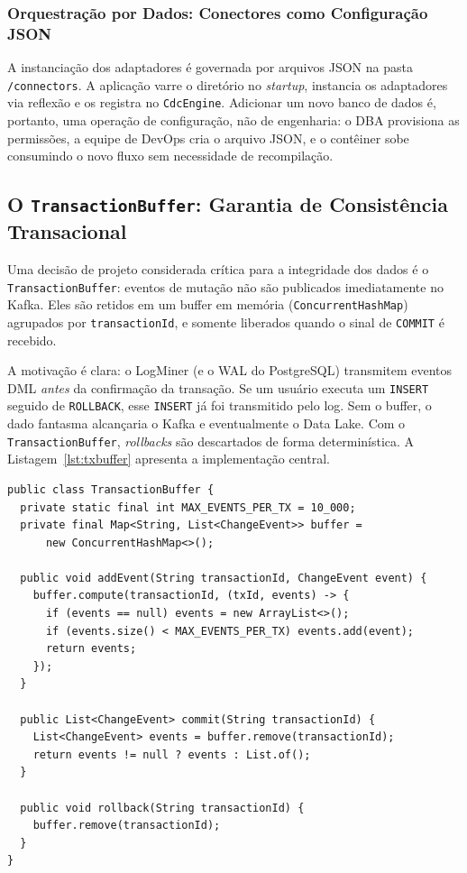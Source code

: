 \documentclass[12pt]{article}
\begin{document}
\subsubsection{Orquestração por Dados: Conectores como Configuração JSON}

A instanciação dos adaptadores é governada por arquivos JSON na pasta
\texttt{/connectors}. A aplicação varre o diretório no \textit{startup},
instancia os adaptadores via reflexão e os registra no \texttt{CdcEngine}.
Adicionar um novo banco de dados é, portanto, uma operação de configuração,
não de engenharia: o DBA provisiona as permissões, a equipe de DevOps cria
o arquivo JSON, e o contêiner sobe consumindo o novo fluxo sem necessidade
de recompilação.

\subsection{O \texttt{TransactionBuffer}: Garantia de Consistência Transacional}

Uma decisão de projeto considerada crítica para a integridade dos dados é o
\texttt{TransactionBuffer}: eventos de mutação não são publicados
imediatamente no Kafka. Eles são retidos em um buffer em memória
(\texttt{ConcurrentHashMap}) agrupados por \texttt{transactionId}, e somente
liberados quando o sinal de \texttt{COMMIT} é recebido.

A motivação é clara: o LogMiner (e o WAL do PostgreSQL) transmitem eventos DML
\textit{antes} da confirmação da transação. Se um usuário executa um
\texttt{INSERT} seguido de \texttt{ROLLBACK}, esse \texttt{INSERT} já foi
transmitido pelo log. Sem o buffer, o dado fantasma alcançaria o Kafka e
eventualmente o Data Lake. Com o \texttt{TransactionBuffer}, \textit{rollbacks}
são descartados de forma determinística. A Listagem~\ref{lst:txbuffer}
apresenta a implementação central.

\begin{lstlisting}[style=javastyle,
  caption={Implementação do \texttt{TransactionBuffer} com limite de eventos por transação.},
  label={lst:txbuffer}]
public class TransactionBuffer {
  private static final int MAX_EVENTS_PER_TX = 10_000;
  private final Map<String, List<ChangeEvent>> buffer =
      new ConcurrentHashMap<>();

  public void addEvent(String transactionId, ChangeEvent event) {
    buffer.compute(transactionId, (txId, events) -> {
      if (events == null) events = new ArrayList<>();
      if (events.size() < MAX_EVENTS_PER_TX) events.add(event);
      return events;
    });
  }

  public List<ChangeEvent> commit(String transactionId) {
    List<ChangeEvent> events = buffer.remove(transactionId);
    return events != null ? events : List.of();
  }

  public void rollback(String transactionId) {
    buffer.remove(transactionId);
  }
}
\end{lstlisting}
\end{document}
